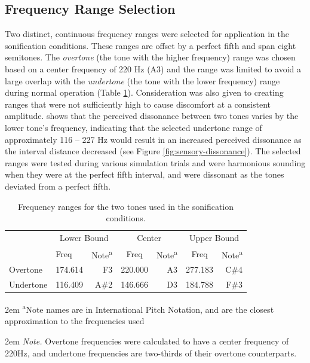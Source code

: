 \documentclass[10pt,a4paper,onecolumn]{article}
\begin{document}
\hypertarget{frequency-range-selection}{%
\subsection{Frequency Range Selection}\label{frequency-range-selection}}

Two distinct, continuous frequency ranges were selected for application in the sonification conditions. These ranges are offset by a perfect fifth and span eight semitones. The \emph{overtone} (the tone with the higher frequency) range was chosen based on a center frequency of 220 Hz (A3) and the range was limited to avoid a large overlap with the \emph{undertone} (the tone with the lower frequency) range during normal operation (Table \ref{tab:frequency-ranges}). Consideration was also given to creating ranges that were not sufficiently high to cause discomfort at a consistent amplitude. \textcite{setharesSoundSound2005} shows that the perceived dissonance between two tones varies by the lower tone's frequency, indicating that the selected undertone range of approximately 116 -- 227 Hz would result in an increased perceived dissonance as the interval distance decreased (see Figure \ref{fig:sensory-dissonance}). The selected ranges were tested during various simulation trials and were harmonious sounding when they were at the perfect fifth interval, and were dissonant as the tones deviated from a perfect fifth.

\begin{table}[!h]

\begin{threeparttable}
\caption{\label{tab:frequency-ranges}Frequency ranges for the two tones used in the sonification conditions.}
\centering
\fontsize{7}{9}\selectfont
\begin{tabular}[t]{>{}l>{}l>{}r>{}c>{}r>{}c>{}r}
\toprule
\multicolumn{1}{c}{} & \multicolumn{2}{c}{Lower Bound} & \multicolumn{2}{c}{Center} & \multicolumn{2}{c}{Upper Bound} \\
\cmidrule(l{3pt}r{3pt}){2-3} \cmidrule(l{3pt}r{3pt}){4-5} \cmidrule(l{3pt}r{3pt}){6-7}
  & Freq & Note\textsuperscript{a} & Freq & Note\textsuperscript{a} & Freq & Note\textsuperscript{a}\\
\midrule
Overtone & 174.614 & F3 & 220.000 & A3 & 277.183 & C\#4\\
Undertone & 116.409 & A\#2 & 146.666 & D3 & 184.788 & F\#3\\
\bottomrule
\end{tabular}
\begin{tablenotes}
\small
\item [] 
\rightskip2em
{\footnotesize \sffamily \textsuperscript{a}Note names are in International Pitch Notation, and are the closest approximation to the frequencies used}
\item [] 
\rightskip2em
{\footnotesize \sffamily \textit{Note.} Overtone frequencies were calculated to have a center frequency of 220Hz, and undertone frequencies are two-thirds of their overtone counterparts.}
\end{tablenotes}
\end{threeparttable}
\end{table}
\end{document}
